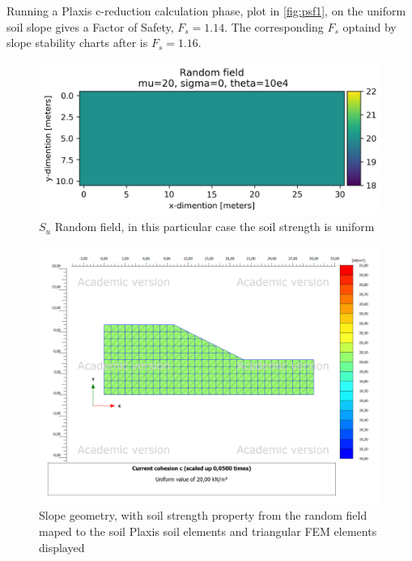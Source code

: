 Running a Plaxis c-reduction calculation phase, plot in \ref{fig:psf1}, on the uniform soil slope gives a Factor of Safety, $F_s = 1.14$. The corresponding $F_s$ optaind by slope stability charts after \citet{Janbu1968slope} is $F_s = 1.16$. 

\begin{figure}[h]
	\includegraphics[width=\textwidth]{fig/testRF}
	\caption{$S_u$ Random field, in this particular case the soil strength is uniform}
	\label{fig:p1}
\end{figure}

\begin{figure}[h]
	\includegraphics[width=\textwidth]{fig/testp}
	\caption{Slope geometry, with soil strength property from the random field maped to the soil Plaxis soil elements and triangular FEM elements displayed}
	\label{fig:p2}
\end{figure}

